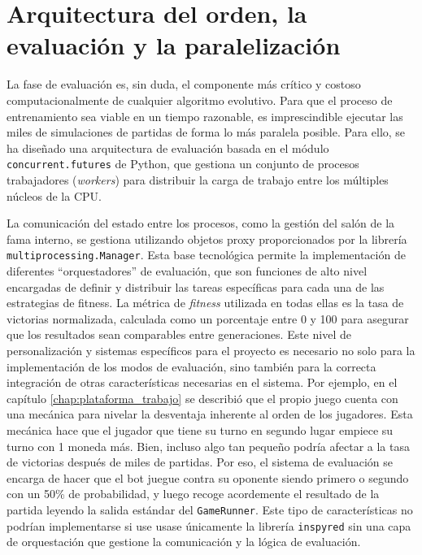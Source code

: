 \section{Arquitectura del orden, la evaluación y la paralelización} \label{sec:paralelizacion_algoritmo}

La fase de evaluación es, sin duda, el componente más crítico y costoso computacionalmente de cualquier algoritmo evolutivo. Para que el proceso de entrenamiento sea viable en un tiempo razonable, es imprescindible ejecutar las miles de simulaciones de partidas de forma lo más paralela posible. Para ello, se ha diseñado una arquitectura de evaluación basada en el módulo \texttt{concurrent.futures} de Python, que gestiona un conjunto de procesos trabajadores (\textit{workers}) para distribuir la carga de trabajo entre los múltiples núcleos de la CPU.

La comunicación del estado entre los procesos, como la gestión del salón de la fama interno, se gestiona utilizando objetos proxy proporcionados por la librería \texttt{multiprocessing.Manager}. Esta base tecnológica permite la implementación de diferentes ``orquestadores'' de evaluación, que son funciones de alto nivel encargadas de definir y distribuir las tareas específicas para cada una de las estrategias de fitness. La métrica de \textit{fitness} utilizada en todas ellas es la tasa de victorias normalizada, calculada como un porcentaje entre 0 y 100 para asegurar que los resultados sean comparables entre generaciones. Este nivel de personalización y sistemas específicos para el proyecto es necesario no solo para la implementación de los modos de evaluación, sino también para la correcta integración de otras características necesarias en el sistema. Por ejemplo, en el capítulo \ref{chap:plataforma_trabajo} se describió que el propio juego cuenta con una mecánica para nivelar la desventaja inherente al orden de los jugadores. Esta mecánica hace que el jugador que tiene su turno en segundo lugar empiece su turno con 1 moneda más. Bien, incluso algo tan pequeño podría afectar a la tasa de victorias después de miles de partidas. Por eso, el sistema de evaluación se encarga de hacer que el bot juegue contra su oponente siendo primero o segundo con un 50\% de probabilidad, y luego recoge acordemente el resultado de la partida leyendo la salida estándar del \texttt{GameRunner}. Este tipo de características no podrían implementarse si use usase únicamente la librería \texttt{inspyred} sin una capa de orquestación que gestione la comunicación y la lógica de evaluación.

